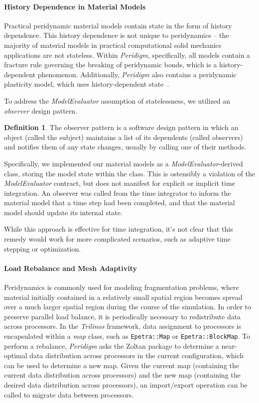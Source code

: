 \documentclass[pdf,ps2pdf,12pt,report]{SANDreport}
\theoremstyle{plain}
\theoremstyle{definition}
\newtheorem{defn}{Definition}[section]
\theoremstyle{remark}
\numberwithin{equation}{section}
\begin{document}
\paragraph{History Dependence in Material Models}

Practical peridynamic material models contain state in the form of history dependence. This history dependence is not unique to peridynamics -- the majority of material models in practical computational solid mechanics applications are not stateless. Within \emph{Peridigm}, specifically, all models contain a fracture rule governing the breaking of peridynamic bonds, which is a history-dependent phenomenon. Additionally, \emph{Peridigm} also contains a peridynamic plasticity model, which uses history-dependent state~\cite{Mitchell:2011:Plasticity}.

To address the \emph{ModelEvaluator} assumption of statelessness, we utilized an \emph{observer} design pattern.
\begin{defn}
The observer pattern is a software design pattern in which an object (called the subject) maintains a list of its dependents (called observers) and notifies them of any state changes, usually by calling one of their methods.
\end{defn}
\noindent
Specifically, we implemented our material models as a \emph{ModelEvaluator}-derived class, storing the model state within the class. This is ostensibly a violation of the \emph{ModelEvaluator} contract, but does not manifest for explicit or implicit time integration. An observer was called from the time integrator to inform the material model that a time step had been completed, and that the material model should update its internal state.

While this approach is effective for time integration, it's not clear that this remedy would work for more complicated scenarios, such as adaptive time stepping or optimization.

\paragraph{Load Rebalance and Mesh Adaptivity}

Peridynamics is commonly used for modeling fragmentation problems, where material initially contained in a relatively small spatial region becomes spread over a much larger spatial region during the course of the simulation. In order to preserve parallel load balance, it is periodically necessary to redistribute data across processors. In the \emph{Trilinos} framework, data assignment to processors is encapsulated within a \emph{map} class, such as \texttt{Epetra::Map} or \texttt{Epetra::BlockMap}. To perform a rebalance, \emph{Peridigm} asks the Zoltan package to determine a near-optimal data distribution across processors in the current configuration, which can be used to determine a new map. Given the current map (containing the current data distribution across processors) and the new map (containing the desired data distribution across processors), an import/export operation can be called to migrate data between processors.
\end{document}
